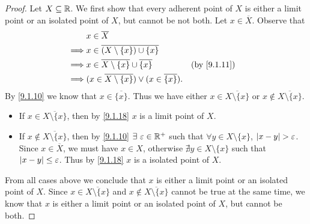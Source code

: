 \begin{proof}
  Let \(X \subseteq \mathbb{R}\).
  We first show that every adherent point of \(X\) is either a limit point or an isolated point of \(X\), but cannot be not both.
  Let \(x \in \overline{X}\).
  Observe that
  \begin{align*}
             & x \in \overline{X}                                                                                 \\
    \implies & x \in \overline{(X \setminus \{x\}) \cup \{x\}}                                                    \\
    \implies & x \in \overline{X \setminus \{x\}} \cup \overline{\{x\}}            &  & \text{(by \cref{9.1.11})} \\
    \implies & (x \in \overline{X \setminus \{x\}}) \lor (x \in \overline{\{x\}}).
  \end{align*}
  By \cref{9.1.10} we know that \(x \in \overline{\{x\}}\).
  Thus we have either \(x \in \overline{X \setminus \{x\}}\) or \(x \notin \overline{X \setminus \{x\}}\).
  \begin{itemize}
    \item If \(x \in \overline{X \setminus \{x\}}\), then by \cref{9.1.18} \(x\) is a limit point of \(X\).
    \item If \(x \notin \overline{X \setminus \{x\}}\), then by \cref{9.1.10} \(\exists\ \varepsilon \in \R^+\) such that \(\forall y \in X \setminus \{x\}\), \(\left\lvert x - y\right\rvert > \varepsilon\).
          Since \(x \in \overline{X}\), we must have \(x \in X\), otherwise \(\nexists y \in X \setminus \{x\}\) such that \(\left\lvert x - y\right\rvert \leq \varepsilon\).
          Thus by \cref{9.1.18} \(x\) is a isolated point of \(X\).
  \end{itemize}
  From all cases above we conclude that \(x\) is either a limit point or an isolated point of \(X\).
  Since \(x \in \overline{X \setminus \{x\}}\) and \(x \notin \overline{X \setminus \{x\}}\) cannot be true at the same time, we know that \(x\) is either a limit point or an isolated point of \(X\), but cannot be both.


\end{proof}
